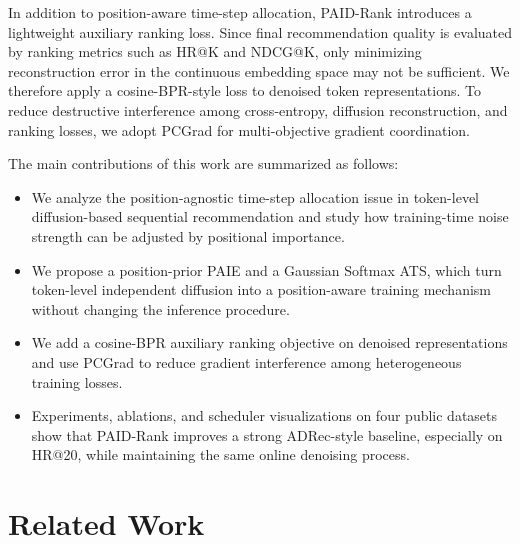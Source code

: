 \documentclass[runningheads,a4paper]{llncs}
\begin{document}
In addition to position-aware time-step allocation, PAID-Rank introduces a lightweight auxiliary ranking loss. Since final recommendation quality is evaluated by ranking metrics such as HR@K and NDCG@K, only minimizing reconstruction error in the continuous embedding space may not be sufficient. We therefore apply a cosine-BPR-style loss to denoised token representations. To reduce destructive interference among cross-entropy, diffusion reconstruction, and ranking losses, we adopt PCGrad for multi-objective gradient coordination.

The main contributions of this work are summarized as follows:
\begin{itemize}
    \item We analyze the position-agnostic time-step allocation issue in token-level diffusion-based sequential recommendation and study how training-time noise strength can be adjusted by positional importance.
    \item We propose a position-prior PAIE and a Gaussian Softmax ATS, which turn token-level independent diffusion into a position-aware training mechanism without changing the inference procedure.
    \item We add a cosine-BPR auxiliary ranking objective on denoised representations and use PCGrad to reduce gradient interference among heterogeneous training losses.
    \item Experiments, ablations, and scheduler visualizations on four public datasets show that PAID-Rank improves a strong ADRec-style baseline, especially on HR@20, while maintaining the same online denoising process.
\end{itemize}

\section{Related Work}
\label{sec:related_work}
\end{document}
